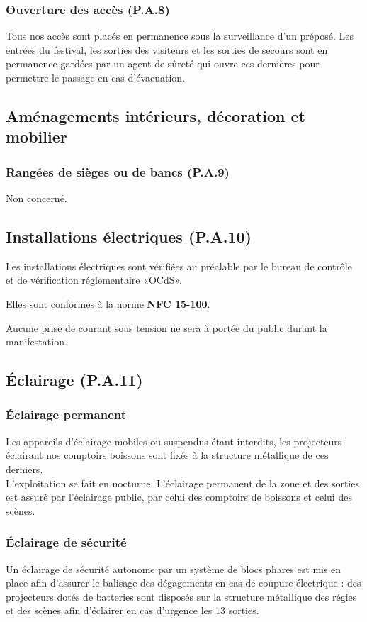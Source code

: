 \documentclass[hidelinks, paper=a4, fontsize=13pt]{report}
\begin{document}
\subsubsection{Ouverture des accès (P.A.8)}

Tous nos accès sont placés en permanence sous la surveillance d’un préposé. Les entrées du festival, les sorties des visiteurs et les sorties de secours sont en permanence gardées par un agent de sûreté qui ouvre ces dernières pour permettre le passage en cas d’évacuation.
\subsection{Aménagements intérieurs, décoration et mobilier}
\subsubsection{Rangées de sièges ou de bancs (P.A.9)}
Non concerné.
\subsection{Installations électriques (P.A.10)}
Les installations électriques sont vérifiées au préalable par le bureau de contrôle et de vérification réglementaire «OCdS». 

Elles sont conformes à la norme \textbf{NFC 15-100}.

Aucune prise de courant sous tension ne sera à portée du public durant la manifestation.
\subsection{Éclairage (P.A.11)}
\subsubsection{Éclairage permanent}

Les appareils d’éclairage mobiles ou suspendus étant interdits, les projecteurs éclairant nos comptoirs boissons sont fixés à la structure métallique de ces derniers. \\

L’exploitation se fait en nocturne. L’éclairage permanent de la zone et des sorties est assuré par l’éclairage public, par celui des comptoirs de boissons et celui des scènes. 

\subsubsection{Éclairage de sécurité}
Un éclairage de sécurité autonome par un système de blocs phares est mis en place afin d’assurer le balisage des dégagements en cas de coupure électrique : des projecteurs dotés de batteries sont disposés sur la structure métallique des régies et des scènes afin d’éclairer en cas d’urgence les 13 sorties. \\
\end{document}
